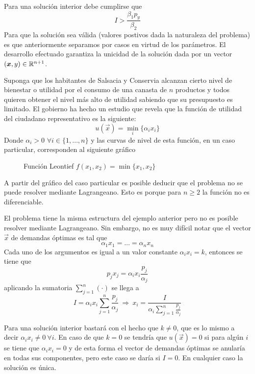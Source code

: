 \begin{ejemplo}
Para una soluci\'on interior debe cumplirse que 
$$I > \frac{\beta_1 p_y}{\beta_2}$$
Para que la soluci\'on sea v\'alida (valores postivos dada la naturaleza del problema) es que anteriormente separamos por casos en virtud de los par\'ametros. El desarrollo efectuado garantiza la unicidad de la soluci\'on dada por un vector $(\boldsymbol{x},y)\in \mathbb{R}^{n+1}$.
\end{ejemplo}

\begin{ejemplo}\label{ejemplo-micro-7}
Suponga que los habitantes de Salsacia y Conservia alcanzan cierto nivel de bienestar o utilidad por el consumo de una canasta de $n$ productos y todos quieren obtener el nivel m\'as alto de utilidad sabiendo que su presupuesto es limitado. El gobierno ha hecho un estudio que revela que la funci\'on de utilidad del ciudadano representativo es la siguiente:
$$u(\vec{x}) = \min_{i}\{\alpha_i x_i\}$$
Donde $\alpha_i > 0$ $\forall i\in\{1,\ldots , n\}$ y las curvas de nivel de esta funci\'on, en un caso particular, corresponden al siguiente gr\'afico

\begin{figure}[H]
	\centering
	
	\caption{Funci\'on Leontief $f(x_1,x_2)=\min\{x_1,x_2\}$}
\end{figure}

A partir del gr\'afico del caso particular es posible deducir que el problema no se puede resolver mediante Lagrangeano. Esto es porque para $n\geq 2$ la funci\'on no es diferenciable.

El problema tiene la misma estructura del ejemplo anterior pero no es posible resolver mediante Lagrangeano. Sin embargo, no es muy dif\'icil notar que el vector $\vec{x}$ de demandas \'optimas es tal que
$$\alpha_1 x_1 = \ldots = \alpha_n x_n$$
Cada uno de los argumentos es igual a un valor constante $\alpha_i x_i = k$, entonces se tiene que
$$p_j x_j = \alpha_i x_i \frac{p_j}{\alpha_j}$$
aplicando la sumatoria $\sum_{j=1}^n (\cdot)$ se llega a 
$$I= \alpha_i x_i \sum_{j=1}^n \frac{p_j}{\alpha_j} \: \Rightarrow \: x_i = \frac{I}{\alpha_i \sum_{j=1}^n \frac{p_j}{\alpha_j}}$$

Para una soluci\'on interior bastar\'a con el hecho que $k \neq 0$, que es lo mismo a decir $\alpha_i x_i \neq 0 \:\forall i$. En caso de que $k=0$ se tendr\'ia que $u(\vec{x})=0$ si para alg\'un $i$ se tiene que $\alpha_i x_i = 0$ y de esta forma el vector de demandas \'optimas se anular\'ia en todas sus componentes, pero este caso se dar\'ia si $I=0$. En cualquier caso la soluci\'on es \'unica.
\end{ejemplo}

